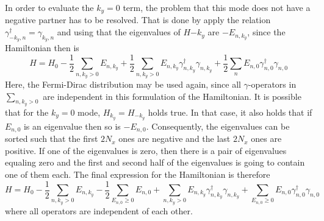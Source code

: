 In order to evaluate the $k_y=0$ term, the problem that this mode does not have a negative partner has to be resolved.
That is done by apply the relation $\gamma^{\dag}_{-k_y,n} = \gamma_{k_y,n}$ and using that the eigenvalues of $H{-k_y}$ are $-E_{n,k_y}$, since the Hamiltonian then is
\begin{equation}\nonumber
    H = H_0 - \frac{1}{2} \sum_{n,k_y>0} E_{n,k_y}+ \frac{1}{2} \sum_{n,k_y>0} E_{n,k_y}\gamma^{\dag}_{n,k_y}\gamma_{n,k_y} + \frac{1}{2}\sum_n E_{n,0}\gamma^{\dag}_{n,0}\gamma_{n,0}
\end{equation}
Here, the Fermi-Dirac distribution may be used again, since all $\gamma$-operators in $\sum_{n,k_y>0}$ are independent in this formulation of the Hamiltonian. \newline
It is possible that for the $k_y = 0$ mode, $H_{k_y}=H_{-k_y}$ holds true.
In that case, it also holds that if $E_{n,0}$ is an eigenvalue then so is $-E_{n,0}$. 
Consequently, the eigenvalues can be sorted such that the first $2N_x$ ones are negative and the last $2N_x$ ones are positive. 
If one of the eigenvalues is zero, then there is a pair of eigenvalues equaling zero and the first and second half of the eigenvalues is going to contain one of them each.
The final expression for the Hamiltonian is therefore
\begin{equation} \label{eq:H_num}
    H = H_0 - \frac{1}{2} \sum_{n,k_y>0} E_{n,k_y} - \frac{1}{2} \sum_{E_{n,0}\geq 0} E_{n,0}+ \sum_{n,k_y>0} E_{n,k_y}\gamma^{\dag}_{n,k_y}\gamma_{n,k_y}+ \sum_{E_{n,0} \geq 0} E_{n,0}\gamma^{\dag}_{n,0}\gamma_{n,0}
\end{equation}
where all operators are independent of each other. 

